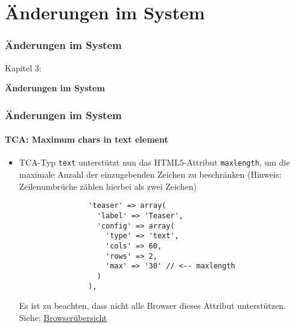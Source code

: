 %

\section{Änderungen im System}
\begin{frame}[fragile]
	\frametitle{Änderungen im System}

	\begin{center}\huge{Kapitel 3:}\end{center}
	\begin{center}\huge{\color{typo3darkgrey}\textbf{Änderungen im System}}\end{center}

\end{frame}


\begin{frame}[fragile]
	\frametitle{Änderungen im System}
	\framesubtitle{TCA: Maximum chars in text element}

	\begin{itemize}
		\item TCA-Typ \texttt{text} unterstützt nun das HTML5-Attribut \texttt{maxlength},
			um die maximale Anzahl der einzugebenden Zeichen zu beschränken
			\small(Hinweis: Zeilenumbrüche zählen hierbei als zwei Zeichen)\normalsize

			\begin{lstlisting}
				'teaser' => array(
				  'label' => 'Teaser',
				  'config' => array(
				    'type' => 'text',
				    'cols' => 60,
				    'rows' => 2,
				    'max' => '30' // <-- maxlength
				  )
				),
			\end{lstlisting}

			\small
				Es ist zu beachten, dass nicht alle Browser dieses Attribut unterstützen.\newline
				Siehe: \href{http://www.w3schools.com/tags/att_textarea_maxlength.asp}{Browserübersicht}
			\normalsize

	\end{itemize}

\end{frame}

